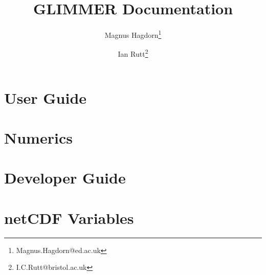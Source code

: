 

\frontmatter
\title{GLIMMER Documentation}
\author{Magnus Hagdorn\thanks{Magnus.Hagdorn@ed.ac.uk} \and Ian Rutt\thanks{I.C.Rutt@bristol.ac.uk}}
\maketitle
\tableofcontents

\mainmatter
\chapter{User Guide}
\newcommand{\dir}{ug}


\chapter{Numerics}
\renewcommand{\dir}{num}


\chapter{Developer Guide}
\renewcommand{\dir}{dg}


\appendix
\renewcommand{\dir}{ug}
\chapter{netCDF Variables}

